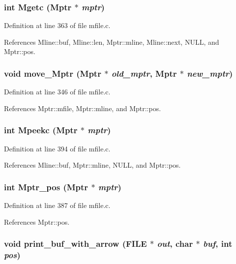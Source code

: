 \subsubsection{\setlength{\rightskip}{0pt plus 5cm}int Mgetc (\bf{Mptr} $\ast$ {\em mptr})}\label{mfile_8c_c4664739cce4f26f42fdd71d8cc13119}




Definition at line 363 of file mfile.c.

References Mline::buf, Mline::len, Mptr::mline, Mline::next, NULL, and Mptr::pos.
\subsubsection{\setlength{\rightskip}{0pt plus 5cm}void move\_\-Mptr (\bf{Mptr} $\ast$ {\em old\_\-mptr}, \bf{Mptr} $\ast$ {\em new\_\-mptr})}\label{mfile_8c_081956979b1e3c7cf53099a1c0817e08}




Definition at line 346 of file mfile.c.

References Mptr::mfile, Mptr::mline, and Mptr::pos.
\subsubsection{\setlength{\rightskip}{0pt plus 5cm}int Mpeekc (\bf{Mptr} $\ast$ {\em mptr})}\label{mfile_8c_74cd5a01b920e491f3ce448ad36f0f24}




Definition at line 394 of file mfile.c.

References Mline::buf, Mptr::mline, NULL, and Mptr::pos.
\subsubsection{\setlength{\rightskip}{0pt plus 5cm}int Mptr\_\-pos (\bf{Mptr} $\ast$ {\em mptr})}\label{mfile_8c_e28a4a586b7c05dfa562605ba3d9e45c}




Definition at line 387 of file mfile.c.

References Mptr::pos.
\subsubsection{\setlength{\rightskip}{0pt plus 5cm}void print\_\-buf\_\-with\_\-arrow (FILE $\ast$ {\em out}, char $\ast$ {\em buf}, int {\em pos})}\label{mfile_8c_e37a5305948b839a902a0e8fc79b9dce}




